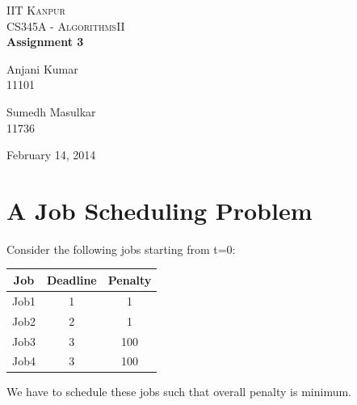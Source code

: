 \documentclass[pdftex,a4paper,12pt]{report}
\begin{document}
\begin{titlepage}
\begin{center}

\textsc{\LARGE IIT Kanpur}\\[1.5cm]

\textsc{\Large CS345A - AlgorithmsII}\\[0.5cm]

{ \huge \bfseries Assignment 3 \\[0.4cm] }


\begin{minipage}{0.4\textwidth}
\begin{flushleft} \large
Anjani Kumar\\
11101
\end{flushleft}
\end{minipage}
\begin{minipage}{0.4\textwidth}
\begin{flushright} \large
Sumedh Masulkar\\
11736
\end{flushright}
\end{minipage}

\vfill

{\large February 14, 2014}

\end{center}
\end{titlepage}

\tableofcontents
\newpage


\section{A Job Scheduling Problem}
Consider the following jobs starting from t=$0$:\\
\begin{center}

\begin{tabular}{c|c|c}
\hline
Job & Deadline & Penalty\\
\hline
Job1 & 1 & 1\\
Job2 & 2 & 1\\
Job3 & 3 & 100\\
Job4 & 3 & 100\\
\hline
\end{tabular}

\end{center}
We have to schedule these jobs such that overall penalty is minimum.
\end{document}
